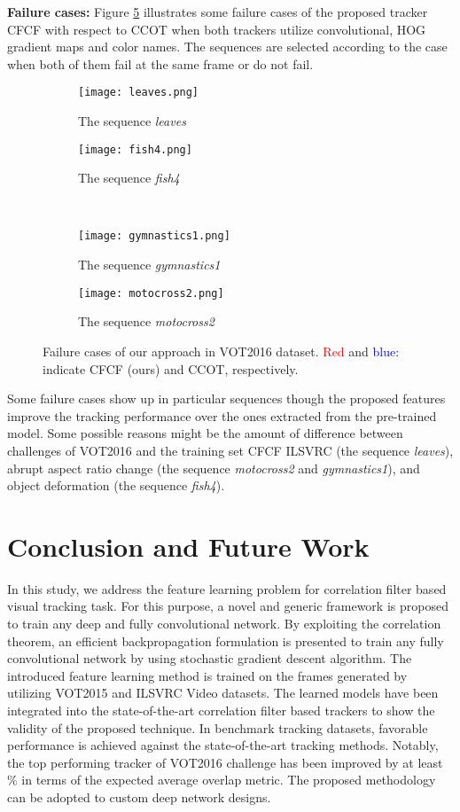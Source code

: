 \documentclass[journal]{IEEEtran}
\newcommand{\first}[1]{\textcolor{red}{#1}}
\newcommand{\second}[1]{\textcolor{blue}{#1}}
\begin{document}
\textbf{Failure cases:} Figure \ref{failureCases} illustrates some failure cases of the proposed tracker CFCF with respect to CCOT \cite{CCOT} when both trackers utilize convolutional, HOG gradient maps and color names. The sequences are selected according to the case when both of them fail at the same frame or do not fail.
\begin{figure}
\begin{subfigure}{.48\linewidth}
  \centering
  \texttt{[image: leaves.png]}
  \caption{The sequence \emph{leaves}}
  \label{Qual1}
\end{subfigure}\begin{subfigure}{.48\linewidth}
  \centering
  \texttt{[image: fish4.png]}
  \caption{The sequence \emph{fish4}}
  \label{Qual2}
\end{subfigure}
\\
\begin{subfigure}{.48\linewidth}
  \centering
  \texttt{[image: gymnastics1.png]}
  \caption{The sequence \emph{gymnastics1}}
  \label{Qual3}
\end{subfigure}\begin{subfigure}{.48\linewidth}
  \centering
  \texttt{[image: motocross2.png]}
  \caption{The sequence \emph{motocross2}}
  \label{Qual4}
\end{subfigure}
\caption{Failure cases of our approach in VOT2016 dataset. \first{Red} and \second{blue:} indicate CFCF (ours) and CCOT, respectively.}
\label{failureCases}
\end{figure}
Some failure cases show up in particular sequences though the proposed features improve the tracking performance over the ones extracted from the pre-trained model. Some possible reasons might be the amount of difference between challenges of VOT2016 and the training set CFCF ILSVRC (the sequence \emph{leaves}), abrupt aspect ratio change (the sequence \emph{motocross2} and \emph{gymnastics1}), and object deformation (the sequence \emph{fish4}).

\section{Conclusion and Future Work}
\label{secConclusion}
In this study, we address the feature learning problem for correlation filter based visual tracking task. For this purpose, a novel and generic framework is proposed to train any deep and fully convolutional network. By exploiting the correlation theorem, an efficient backpropagation formulation is presented to train any fully convolutional network by using stochastic gradient descent algorithm. The introduced feature learning method is trained on the frames generated by utilizing VOT2015 and ILSVRC Video datasets. The learned models have been integrated into the state-of-the-art correlation filter based trackers to show the validity of the proposed technique. In benchmark tracking datasets, favorable performance is achieved against the state-of-the-art tracking methods. Notably, the top performing tracker of VOT2016 challenge has been improved by at least \% in terms of the expected average overlap metric. The proposed methodology can be adopted to custom deep network designs.
\appendices
\end{document}
